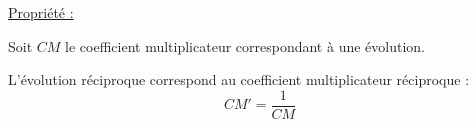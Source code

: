\documentclass[12pt]{article}
\begin{document}
\vspace{0.5cm}
{\color{black!30}\dotfill}

\vspace{0.5cm}
{\color{black!30}\dotfill}

\vspace{0.5cm}
{\color{black!30}\dotfill}

\vspace{0.5cm}
{\color{black!30}\dotfill}

\newpage
\begin{mdframed}[
    linewidth=1pt,
    roundcorner=5pt,
    linecolor=Red,
    innertopmargin=10pt,
    innerbottommargin=0pt
]
{\color{red}
\underline{Propriété :}

\vspace{5pt}
Soit $CM$ le coefficient multiplicateur correspondant à une évolution.

\vspace{5pt}
L'évolution réciproque correspond au coefficient multiplicateur réciproque : 
\[
CM' = \dfrac{1}{CM}
\]
}
\end{mdframed}
\end{document}
